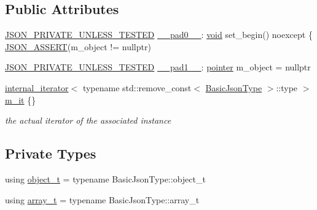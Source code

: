 \subsection*{Public Attributes}
\begin{DoxyCompactItemize}
\item 
\hyperlink{json_8hpp_a2cf645f34610e7f7d6e09ab88a2ab917}{J\+S\+O\+N\+\_\+\+P\+R\+I\+V\+A\+T\+E\+\_\+\+U\+N\+L\+E\+S\+S\+\_\+\+T\+E\+S\+T\+ED} \hyperlink{classnlohmann_1_1detail_1_1iter__impl_aa4bddeaa9a97b2a9b715918a7e8dcc3a}{\+\_\+\+\_\+pad0\+\_\+\+\_\+}\+: \hyperlink{namespacenlohmann_1_1detail_a59fca69799f6b9e366710cb9043aa77d}{void} set\+\_\+begin() noexcept \{ \hyperlink{json_8hpp_a69f131cff49da1989667220173fbeae6}{J\+S\+O\+N\+\_\+\+A\+S\+S\+E\+RT}(m\+\_\+object != nullptr)
\item 
\hyperlink{json_8hpp_a2cf645f34610e7f7d6e09ab88a2ab917}{J\+S\+O\+N\+\_\+\+P\+R\+I\+V\+A\+T\+E\+\_\+\+U\+N\+L\+E\+S\+S\+\_\+\+T\+E\+S\+T\+ED} \hyperlink{classnlohmann_1_1detail_1_1iter__impl_a4a60e9d074cc53929b73eaa7963f1fa9}{\+\_\+\+\_\+pad1\+\_\+\+\_\+}\+: \hyperlink{classnlohmann_1_1detail_1_1iter__impl_a69e52f890ce8c556fd68ce109e24b360}{pointer} m\+\_\+object = nullptr
\item 
\hyperlink{structnlohmann_1_1detail_1_1internal__iterator}{internal\+\_\+iterator}$<$ typename std\+::remove\+\_\+const$<$ \hyperlink{classnlohmann_1_1detail_1_1iter__impl_abf18f18793f84b0222aebb5a2a87da7a}{Basic\+Json\+Type} $>$\+::type $>$ \hyperlink{classnlohmann_1_1detail_1_1iter__impl_a8a86a7c0d4af0cc4ab345b6f0e13cdfa}{m\+\_\+it} \{\}
\begin{DoxyCompactList}\small\item\em the actual iterator of the associated instance \end{DoxyCompactList}\end{DoxyCompactItemize}
\subsection*{Private Types}
\begin{DoxyCompactItemize}
\item 
using \hyperlink{classnlohmann_1_1detail_1_1iter__impl_ab9a9598052e83fa14a2288e56d5dda7c}{object\+\_\+t} = typename Basic\+Json\+Type\+::object\+\_\+t
\item 
using \hyperlink{classnlohmann_1_1detail_1_1iter__impl_aef02cf75b1cb199286fd2f666c60e38e}{array\+\_\+t} = typename Basic\+Json\+Type\+::array\+\_\+t
\end{DoxyCompactItemize}
